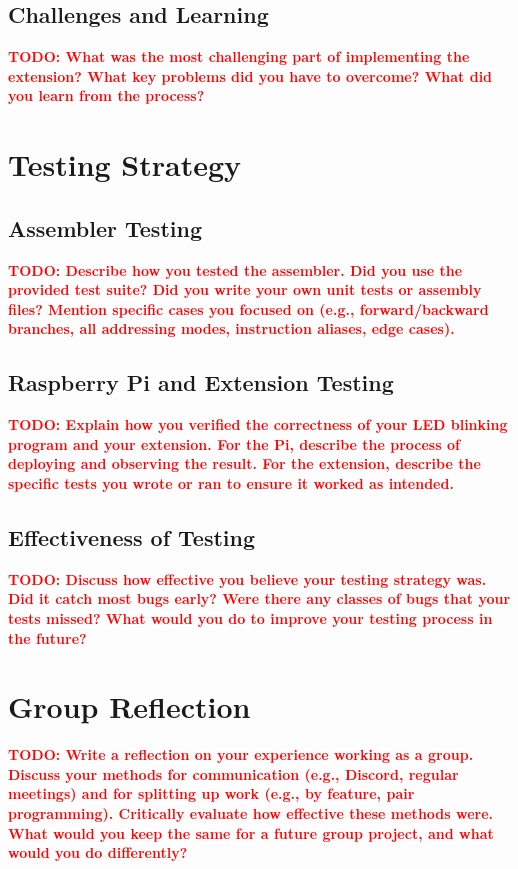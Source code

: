 \documentclass[11pt]{article}
\newcommand{\todo}[1]{\textcolor{red}{\textbf{TODO: #1}}}
\begin{document}
\subsection{Challenges and Learning}
\todo{What was the most challenging part of implementing the extension? What key problems did you have to overcome? What did you learn from the process?}


\section{Testing Strategy}

\subsection{Assembler Testing}
\todo{Describe how you tested the assembler. Did you use the provided test suite? Did you write your own unit tests or assembly files? Mention specific cases you focused on (e.g., forward/backward branches, all addressing modes, instruction aliases, edge cases).}

\subsection{Raspberry Pi and Extension Testing}
\todo{Explain how you verified the correctness of your LED blinking program and your extension. For the Pi, describe the process of deploying and observing the result. For the extension, describe the specific tests you wrote or ran to ensure it worked as intended.}

\subsection{Effectiveness of Testing}
\todo{Discuss how effective you believe your testing strategy was. Did it catch most bugs early? Were there any classes of bugs that your tests missed? What would you do to improve your testing process in the future?}


\section{Group Reflection}
\todo{Write a reflection on your experience working as a group. Discuss your methods for communication (e.g., Discord, regular meetings) and for splitting up work (e.g., by feature, pair programming). Critically evaluate how effective these methods were. What would you keep the same for a future group project, and what would you do differently?}
\end{document}
